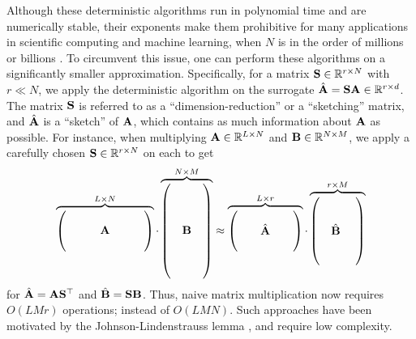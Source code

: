 \documentclass[journal,letterpaper,onecolumn,twoside,nofonttune]{IEEEtran}
\newcommand{\R}{\mathbb{R}}
\newcommand{\Ab}{\bold{A}}
\newcommand{\Bb}{\bold{B}}
\newcommand{\Ib}{\bold{I}}
\newcommand{\Sb}{\bold{S}}
\newcommand{\Abh}{\hat{\Ab}}
\newcommand{\Bbh}{\hat{\Bb}}
\begin{document}
Although these deterministic algorithms run in polynomial time and are numerically stable, their exponents make them prohibitive for many applications in scientific computing and machine learning, when $N$ is in the order of millions or billions \cite{MLG08,Mah12}. To circumvent this issue, one can perform these algorithms on a significantly smaller approximation. Specifically, for a matrix $\Sb\in\R^{r\times N}$ with $r\ll N$, we apply the deterministic algorithm on the surrogate $\Abh=\Sb\Ab\in\R^{r\times d}$. The matrix $\Sb$ is referred to as a ``dimension-reduction'' or a ``sketching'' matrix, and $\Abh$ is a ``sketch'' of $\Ab$, which contains as much information about $\Ab$ as possible. For instance, when multiplying $\Ab\in\R^{L\times N}$ and $\Bb\in\R^{N\times M}$, we apply a carefully chosen $\Sb\in\R^{r\times N}$ on each to get
$$ \overbrace{\begin{pmatrix} & & & & & & \\ & & & \Ab & & & \\ & & & & & & \end{pmatrix}}^{L\times N} \cdot \overbrace{\begin{pmatrix} & & \\ & & \\ & & \\ & \Bb & \\ & & \\ & & \\ & & \end{pmatrix}}^{N\times M} \approx \overbrace{\begin{pmatrix} & & & & \\ & & \Abh & & \\ & & & & \end{pmatrix}}^{L\times r} \cdot \overbrace{\begin{pmatrix} & & \\ & & \\ & \Bbh\ & \\ & & \\ & & \end{pmatrix}}^{r\times M} $$
for $\Abh=\Ab\Sb^\top$ and $\Bbh=\Sb\Bb$. Thus, naive matrix multiplication now requires $O(LMr)$ operations; instead of $O(LMN)$. Such approaches have been motivated by the Johnson-Lindenstrauss lemma \cite{JL84}, and require low complexity.%
\end{document}
